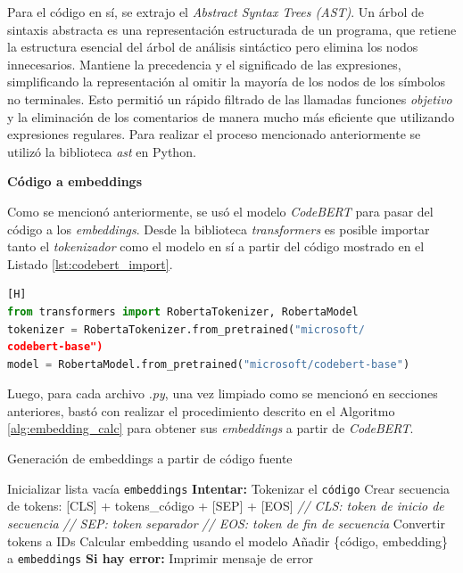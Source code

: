 \documentclass[11pt,a4paper,twoside,openany]{tesis}
\begin{document}
Para el código en sí, se extrajo el  \emph{Abstract Syntax Trees (AST)}. Un árbol de sintaxis abstracta es una representación estructurada de un programa, que retiene la estructura esencial del árbol de análisis sintáctico pero elimina los nodos innecesarios. Mantiene la precedencia y el significado de las expresiones, simplificando la representación al omitir la mayoría de los nodos de los símbolos no terminales\cite{cooper2011engineering}. Esto permitió un rápido filtrado de las llamadas funciones \emph{objetivo} y la eliminación de los comentarios de manera mucho más eficiente que utilizando expresiones regulares. Para realizar el proceso mencionado anteriormente se utilizó la biblioteca \emph{ast} \cite{ast} en Python.



\textbf{Código a embeddings}

Como se mencionó anteriormente, se usó el modelo \emph{CodeBERT} para pasar del código a los \emph{embeddings}. Desde la biblioteca \emph{transformers} \cite{roberta_model} es posible importar tanto el \emph{tokenizador} como el modelo en sí a partir del código mostrado en el Listado \ref{lst:codebert_import}.

\begin{lstlisting}[language=Python, label={lst:codebert_import}, caption={Importación de CodeBERT}][H]
from transformers import RobertaTokenizer, RobertaModel
tokenizer = RobertaTokenizer.from_pretrained("microsoft/
codebert-base")
model = RobertaModel.from_pretrained("microsoft/codebert-base")
\end{lstlisting}

Luego, para cada archivo \emph{.py}, una vez limpiado como se mencionó en secciones anteriores, bastó con realizar el procedimiento descrito en el Algoritmo \ref{alg:embedding_calc} para obtener sus \emph{embeddings} a partir de \emph{CodeBERT}.

\begin{algorithm}[H]
\caption{Generación de embeddings a partir de código fuente}
\label{alg:embedding_calc}
\begin{algorithmic}[1]
\State Inicializar lista vacía \texttt{embeddings}
    \State \textbf{Intentar:}
        \State Tokenizar el \texttt{código}
        \State Crear secuencia de tokens:
        \State \hspace{\algorithmicindent} [CLS] + tokens\_código + [SEP] + [EOS]
        \State \hspace{\algorithmicindent} \textit{// CLS: token de inicio de secuencia}
        \State \hspace{\algorithmicindent} \textit{// SEP: token separador}
        \State \hspace{\algorithmicindent} \textit{// EOS: token de fin de secuencia}
        \State Convertir tokens a IDs
        \State Calcular embedding usando el modelo
        \State Añadir \{código, embedding\} a \texttt{embeddings}
    \State \textbf{Si hay error:}
        \State Imprimir mensaje de error
\EndFor
\end{algorithmic}
\end{algorithm}
\end{document}
